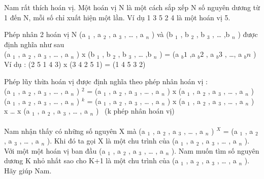 Nam rất thích hoán vị. Một hoán vị N là một cách sắp xếp N số nguyên dương từ 1 đến N, mỗi số chỉ xuất hiện một lần. Ví dụ 1 3 5 2 4 là một hoán vị 5.

Phép nhân 2 hoán vị N (a $_ 1 $ , a $_ 2 $ , a $_ 3 $ , … , a $_ n $ ) và (b $_ 1 $ , b $_ 2 $ , b $_ 3 $ , … ,b $_ n $ ) được định nghĩa như sau
\\(a $_ 1 $ , a $_ 2 $ , a $_ 3 $ , … , a $_ n $ ) x (b $_ 1 $ , b $_ 2 $ , b $_ 3 $ , … ,b $_ n $ ) = (a $_ b1 $ ,a $_ b2 $ , a $_ b3 $ , …, a $_ bn $ )
\\Ví dụ : (2 5 1 4 3) x (3 4 2 5 1) = (1 4 5 3 2)

Phép lũy thừa hoán vị được định nghĩa theo phép nhân hoán vị :
\\(a $_ 1 $ , a $_ 2 $ , a $_ 3 $ , … , a $_ n $ ) $^ 2 $ = (a $_ 1 $ , a $_ 2 $ , a $_ 3 $ , … , a $_ n $ ) x (a $_ 1 $ , a $_ 2 $ , a $_ 3 $ , … , a $_ n $ )
\\(a $_ 1 $ , a $_ 2 $ , a $_ 3 $ , … , a $_ n $ ) $^ k $ = (a $_ 1 $ , a $_ 2 $ , a $_ 3 $ , … , a $_ n $ ) x (a $_ 1 $ , a $_ 2 $ , a $_ 3 $ , … , a $_ n $ ) x … x (a $_ 1 $ , a $_ 2 $ , a $_ 3 $ , … , a $_ n $ )  (k phép nhân hoán vị)
\\
\\Nam nhận thấy có những số nguyên X mà (a $_ 1 $ , a $_ 2 $ , a $_ 3 $ , … , a $_ n $ ) $^ X $ = (a $_ 1 $ , a $_ 2 $ , a $_ 3 $ , … , a $_ n $ ). Khi đó ta gọi X là một chu trình của (a $_ 1 $ , a $_ 2 $ , a $_ 3 $ , … , a $_ n $ ).
\\Với một một hoán vị ban đầu (a $_ 1 $ , a $_ 2 $ , a $_ 3 $ , … , a $_ n $ ). Nam muốn tìm số nguyên dương K nhỏ nhất sao cho K+1 là một chu trình của (a $_ 1 $ , a $_ 2 $ , a $_ 3 $ , … , a $_ n $ ). Hãy giúp Nam.

\